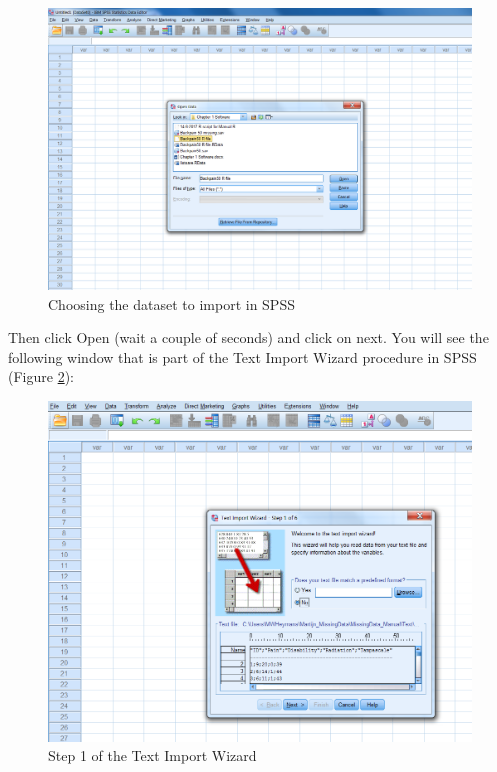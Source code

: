 \documentclass[]{book}
\begin{document}
\begin{figure}

{\centering \includegraphics[width=0.95\linewidth]{images/fig1.18} 

}

\caption{Choosing the dataset to import in SPSS}\label{fig:fig18}
\end{figure}

Then click Open (wait a couple of seconds) and click on next. You will
see the following window that is part of the Text Import Wizard
procedure in SPSS (Figure \ref{fig:fig19}):

\begin{figure}

{\centering \includegraphics[width=0.95\linewidth]{images/fig1.19} 

}

\caption{Step 1 of the Text Import Wizard}\label{fig:fig19}
\end{figure}
\end{document}

